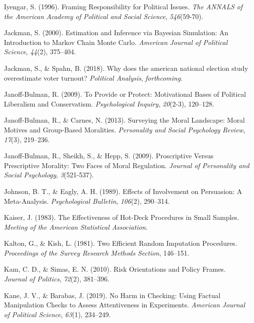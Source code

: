 \documentclass[12pt,econ]{sources/authesis}
\begin{document}
\leavevmode\hypertarget{ref-iyengar_framing_1996}{}%
Iyengar, S. (1996). Framing Responsibility for Political Issues. \emph{The ANNALS of the American Academy of Political and Social Science}, \emph{546}(59-70).

\leavevmode\hypertarget{ref-jackman_2000_estimation}{}%
Jackman, S. (2000). Estimation and Inference via Bayesian Simulation: An Introduction to Markov Chain Monte Carlo. \emph{American Journal of Political Science}, \emph{44}(2), 375--404.

\leavevmode\hypertarget{ref-jackman_2018_does}{}%
Jackman, S., \& Spahn, B. (2018). Why does the american national election study overestimate voter turnout? \emph{Political Analysis}, \emph{forthcoming}.

\leavevmode\hypertarget{ref-janoff-bulman_2009_provide}{}%
Janoff-Bulman, R. (2009). To Provide or Protect: Motivational Bases of Political Liberalism and Conservatism. \emph{Psychological Inquiry}, \emph{20}(2-3), 120--128.

\leavevmode\hypertarget{ref-janoff-bulman_2013_surveying}{}%
Janoff-Bulman, R., \& Carnes, N. (2013). Surveying the Moral Landscape: Moral Motives and Group-Based Moralities. \emph{Personality and Social Psychology Review}, \emph{17}(3), 219--236.

\leavevmode\hypertarget{ref-janoff-bulman_2009_proscriptive}{}%
Janoff-Bulman, R., Sheikh, S., \& Hepp, S. (2009). Proscriptive Versus Prescriptive Morality: Two Faces of Moral Regulation. \emph{Journal of Personality and Social Psychology}, \emph{3}(521-537).

\leavevmode\hypertarget{ref-johnson_1989_effects}{}%
Johnson, B. T., \& Eagly, A. H. (1989). Effects of Involvement on Persuasion: A Meta-Analysis. \emph{Psychological Bulletin}, \emph{106}(2), 290--314.

\leavevmode\hypertarget{ref-kaiser_1983_effectiveness}{}%
Kaiser, J. (1983). The Effectiveness of Hot-Deck Procedures in Small Samples. \emph{Meeting of the American Statistical Association}.

\leavevmode\hypertarget{ref-kalton_1981_efficient}{}%
Kalton, G., \& Kish, L. (1981). Two Efficient Random Imputation Procedures. \emph{Proceedings of the Survey Research Methods Section}, 146--151.

\leavevmode\hypertarget{ref-kam_risk_2010}{}%
Kam, C. D., \& Simas, E. N. (2010). Risk Orientations and Policy Frames. \emph{Journal of Politics}, \emph{72}(2), 381--396.

\leavevmode\hypertarget{ref-kane_2019_harm}{}%
Kane, J. V., \& Barabas, J. (2019). No Harm in Checking: Using Factual Manipulation Checks to Assess Attentiveness in Experiments. \emph{American Journal of Political Science}, \emph{63}(1), 234--249.
\end{document}
